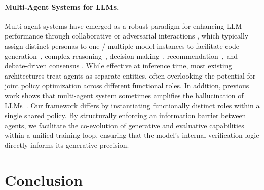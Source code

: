 \documentclass[10pt, a4paper, logo]{googledeepmind} %
\begin{document}
\paragraph{Multi-Agent Systems for LLMs.}
Multi-agent systems have emerged as a robust paradigm for enhancing LLM performance through collaborative or adversarial interactions \citep{du2023improvingfactualityreasoninglanguage,li2023camel}, which typically assign distinct personas to one / multiple model instances to facilitate code generation~\citep{huang2023agentcoder,islam2024mapcoder}, complex reasoning~\citep{li2023camel,he2023lego,talebirad2023multi}, decision-making~\citep{shinn2023reflexion,yu2024fincon}, recommendation~\citep{wang2024macrec}, and debate-driven consensus \citep{du2023improvingfactualityreasoninglanguage,liang2024encouraging}. While effective at inference time, most existing architectures treat agents as separate entities, often overlooking the potential for joint policy optimization across different functional roles. In addition, previous work shows that multi-agent system sometimes amplifies the hallucination of LLMs~\citep{hong2023metagpt}. Our framework differs by instantiating functionally distinct roles within a single shared policy. By structurally enforcing an information barrier between agents, we facilitate the co-evolution of generative and evaluative capabilities within a unified training loop, ensuring that the model’s internal verification logic directly informs its generative precision.

\section{Conclusion}
\vspace{-2mm}
\end{document}
